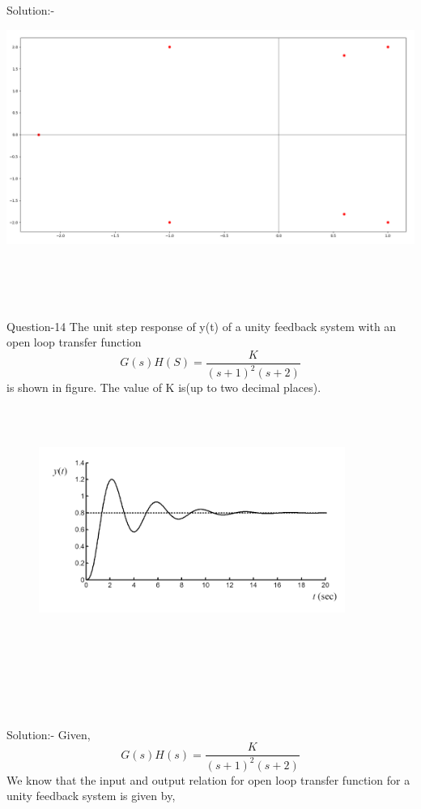 \documentclass[journal,12pt,twocolumn]{IEEEtran}
\begin{document}
\begin{frame}{Solution:- }
\begin{frame}{}
\begin{frame}{}
\includegraphics[scale=0.15]{./figs/Roots.png}
\end{frame}
\\\\\\
\begin{frame}{Question-14 }
The unit step response of y(t) of a unity feedback system with an open loop transfer function  
\[ G(s)H(S)=\frac{K}{(s+1)^2(s+2)}  \]
is shown in figure. The value of K is(up to two decimal places).
\end{frame}
\begin{frame}{}
\begin{figure}[h]
    \includegraphics[width=10cm, height=8cm]{./figs/Screenshot(32).png}    
\end{figure}
\end{frame}
\\\\\
\begin{frame}{Solution:- }
Given,
\[ G(s)H(s)=\frac{K}{(s+1)^2(s+2)}  \]
We know that the input and output relation for open loop transfer function for a unity feedback system is given by,

\end{frame}
\end{frame}
\end{frame}
\end{document}
